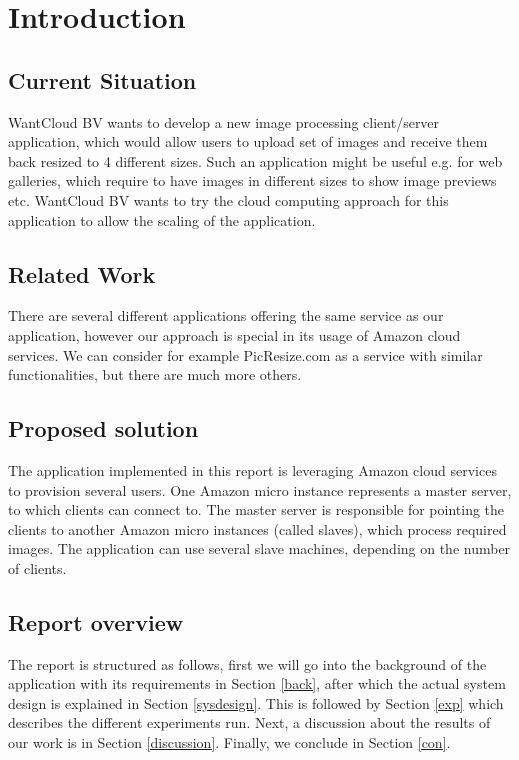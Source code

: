 \section{Introduction}
\subsection{Current Situation} 
WantCloud BV wants to develop a new image processing client/server application, which would allow users to upload set of images and receive them back resized to 4 different sizes. Such an application might be useful e.g. for web galleries, which require to have images in different sizes to show image previews etc. WantCloud BV wants to try the cloud computing approach for this application to allow the scaling of the application.

\subsection{Related Work} 
There are several different applications offering the same service as our application, however our approach is special in its usage of Amazon cloud services. We can consider for example PicResize.com\cite{picresize} as a service with similar functionalities, but there are much more others.

\subsection{Proposed solution}
The application implemented in this report is leveraging Amazon cloud services to provision several users. One Amazon micro instance represents a master server, to which clients can connect to. The master server is responsible for pointing the clients to another Amazon micro instances (called slaves), which process required images. The application can use several slave machines, depending on the number of clients.

\subsection{Report overview}
The report is structured as follows, first we will go into the background of the application with its requirements in Section \ref{back}, after which the actual system design is explained in Section \ref{sysdesign}. This is followed by Section \ref{exp} which describes the different experiments run. Next, a discussion about the results of our work is in Section \ref{discussion}. Finally, we conclude in Section \ref{con}.